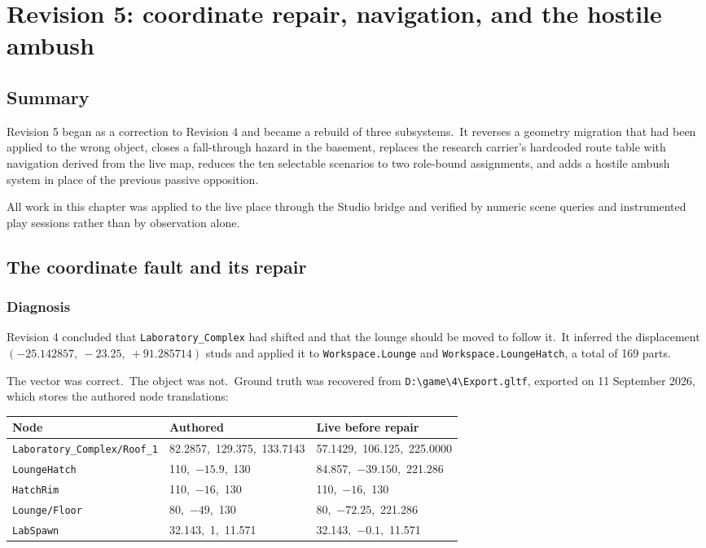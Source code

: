 \chapter{Revision 5: coordinate repair, navigation, and the hostile ambush}

\section{Summary}
Revision 5 began as a correction to Revision 4 and became a rebuild of three
subsystems.\ It reverses a geometry migration that had been applied to the wrong
object, closes a fall-through hazard in the basement, replaces the research
carrier's hardcoded route table with navigation derived from the live map,
reduces the ten selectable scenarios to two role-bound assignments, and adds a
hostile ambush system in place of the previous passive opposition.\

All work in this chapter was applied to the live place through the Studio
bridge and verified by numeric scene queries and instrumented play sessions
rather than by observation alone.\

\section{The coordinate fault and its repair}

\subsection{Diagnosis}
Revision 4 concluded that \texttt{Laboratory\_Complex} had shifted and that the
lounge should be moved to follow it.\ It inferred the displacement
$(-25.142857,\ -23.25,\ +91.285714)$ studs and applied it to
\texttt{Workspace.Lounge} and \texttt{Workspace.LoungeHatch}, a total of 169
parts.\

The vector was correct.\ The object was not.\ Ground truth was recovered from
\texttt{D:\textbackslash game\textbackslash 4\textbackslash Export.gltf},
exported on 11 September 2026, which stores the authored node translations:

\begin{center}
\begin{tabular}{@{}lll@{}}
\toprule
\textbf{Node} & \textbf{Authored} & \textbf{Live before repair} \\
\midrule
\texttt{Laboratory\_Complex/Roof\_1} & 82.2857,\ 129.375,\ 133.7143 & 57.1429,\ 106.125,\ 225.0000 \\
\texttt{LoungeHatch} & 110,\ $-15.9$,\ 130 & 84.857,\ $-39.150$,\ 221.286 \\
\texttt{HatchRim} & 110,\ $-16$,\ 130 & 110,\ $-16$,\ 130 \\
\texttt{Lounge/Floor} & 80,\ $-49$,\ 130 & 80,\ $-72.25$,\ 221.286 \\
\texttt{LabSpawn} & 32.143,\ 1,\ 11.571 & 32.143,\ $-0.1$,\ 11.571 \\
\bottomrule
\end{tabular}
\end{center}

